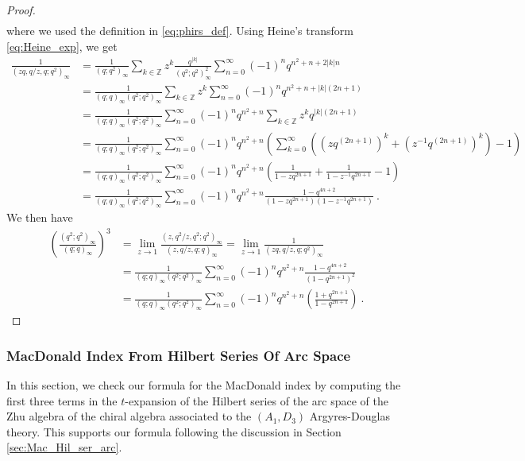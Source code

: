 \documentclass[a4paper,10pt]{article}
\newcommand{\Z}{\mathds{Z}}
\begin{document}
\begin{thm}
\begin{proof}
\begin{equation}
\begin{split}
\end{split}
\end{equation}
where we used the definition in \eqref{eq:phirs_def}. Using Heine's transform \eqref{eq:Heine_exp}, we get 
\begin{equation}
\begin{split}
\frac{1}{(zq,q/z,q;q^2)_\infty}&=\frac{1}{(q;q^2)_\infty}\sum_{k\in\Z}z^k\frac{q^{|k|}}{(q^2;q^2)^2_{\infty}}\sum_{n=0}^\infty(-1)^nq^{n^2+n+2|k|n}
\\&=\frac{1}{(q;q)_\infty(q^2;q^2)_{\infty}}\sum_{k\in\Z}z^k\sum_{n=0}^\infty(-1)^nq^{n^2+n+|k|(2n+1)}
\\&=\frac{1}{(q;q)_\infty(q^2;q^2)_{\infty}}\sum_{n=0}^\infty(-1)^nq^{n^2+n}\sum_{k\in\Z}z^kq^{|k|(2n+1)}
\\&=\frac{1}{(q;q)_\infty(q^2;q^2)_{\infty}}\sum_{n=0}^\infty(-1)^nq^{n^2+n}\left(\sum_{k=0}^\infty\left((zq^{(2n+1)})^k+(z^{-1}q^{(2n+1)})^k\right)-1\right)
\\&=\frac{1}{(q;q)_\infty(q^2;q^2)_{\infty}}\sum_{n=0}^\infty(-1)^nq^{n^2+n}\left(\frac{1}{1-zq^{2n+1}}+\frac{1}{1-z^{-1}q^{2n+1}}-1\right)
\\&=\frac{1}{(q;q)_\infty(q^2;q^2)_{\infty}}\sum_{n=0}^\infty(-1)^nq^{n^2+n}\frac{1-q^{4n+2}}{(1-zq^{2n+1})(1-z^{-1}q^{2n+1})}~.
\end{split}    
\end{equation}
We then have 
\begin{equation}
\begin{split}
    \left(\frac{\left(q^{2} ; q^{2}\right)_{\infty}}{(q ; q)_{\infty}}\right)^3&=\lim_{z\to 1}\frac{(z,q^2/z,q^2;q^2)_\infty}{(z,q/z,q;q)_\infty}=\lim_{z\to 1}\frac{1}{(zq,q/z,q;q^2)_\infty}
    \\&=\frac{1}{(q;q)_\infty(q^2;q^2)_{\infty}}\sum_{n=0}^\infty(-1)^nq^{n^2+n}\frac{1-q^{4n+2}}{(1-q^{2n+1})^2}
    \\&=\frac{1}{(q;q)_\infty(q^2;q^2)_{\infty}}\sum_{n=0}^\infty(-1)^nq^{n^2+n}\left(\frac{1+q^{2n+1}}{1-q^{2n+1}}\right)~.
\end{split}    
\end{equation}
\end{proof}
\end{thm}
\subsubsection{MacDonald Index From Hilbert Series Of Arc Space}\label{sec:Hilb_arc_MacD3}
In this section, we check our formula for the MacDonald index by computing the first three terms in the $t$-expansion of the Hilbert series of the arc space of the Zhu algebra of the chiral algebra associated to the $(A_1,D_3)$ Argyres-Douglas theory. This supports our formula following the discussion in Section \ref{sec:Mac_Hil_ser_arc}. 
\end{document}
